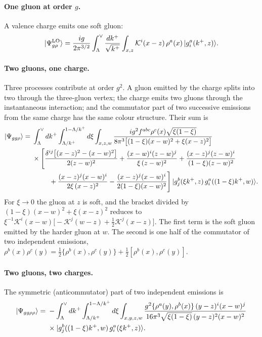 \documentclass[aps,prd,onecolumn,superscriptaddress,nofootinbib,floatfix,longbibliography,11pt]{revtex4-2}
\numberwithin{equation}{section}
\newcommand{\KK}{\mathcal{K}}
\begin{document}
\paragraph*{One gluon at order $g$.} A valence charge emits one soft gluon:
\begin{equation}
|\Psi^{\rm LO}_{g\rho}\rangle=\frac{ig}{2\pi^{3/2}}\int_{\Lambda}^{\vee}\frac{dk^+}{\sqrt{k^+}}\int_{x,z}\KK^i(x-z)\,\rho^a(x)\,|g^a_i(k^+,z)\rangle .
\label{eq:LOwf}
\end{equation}

\paragraph*{Two gluons, one charge.} Three processes contribute at order $g^2$. A gluon emitted by the charge splits into two through the three-gluon vertex; the charge emits two gluons through the instantaneous interaction; and the commutator part of two successive emissions from the same charge has the same colour structure. Their sum is
\begin{align}
|\Psi_{gg\rho}\rangle={}&\int_{\Lambda}^{\vee}dk^+\int_{\Lambda/k^+}^{1-\Lambda/k^+}d\xi\int_{x,z,w}\frac{ig^2f^{abc}\rho^c(x)\sqrt{\xi(1-\xi)}}{8\pi^3\big[(1-\xi)(x-w)^2+\xi(x-z)^2\big]}\notag\\
&\times\Bigg[\frac{\delta^{ij}\big[(x-z)^2-(x-w)^2\big]}{2(z-w)^2}+\frac{(x-w)^i(z-w)^j}{\xi\,(z-w)^2}+\frac{(x-z)^j(z-w)^i}{(1-\xi)(z-w)^2}\notag\\
&\hspace{2.5em}+\frac{(x-z)^j(x-w)^i}{2\xi\,(x-z)^2}-\frac{(x-z)^j(x-w)^i}{2(1-\xi)(x-w)^2}\Bigg]\,|g^b_j(\xi k^+,z)\,g^a_i((1-\xi)k^+,w)\rangle .
\label{eq:ggrho}
\end{align}
For $\xi\to0$ the gluon at $z$ is soft, and the bracket divided by $(1-\xi)(x-w)^2+\xi(x-z)^2$ reduces to $\xi^{-1}\KK^i(x-w)\big[-\KK^j(w-z)+\tfrac12\KK^j(x-z)\big]$. The first term is the soft gluon emitted by the harder gluon at $w$. The second is one half of the commutator of two independent emissions, $\rho^b(x)\rho^c(y)=\frac12\{\rho^b(x),\rho^c(y)\}+\frac12[\rho^b(x),\rho^c(y)]$.

\paragraph*{Two gluons, two charges.} The symmetric (anticommutator) part of two independent emissions is
\begin{align}
|\Psi_{gg\rho\rho}\rangle={}&-\int_{\Lambda}^{\vee}dk^+\int_{\Lambda/k^+}^{1-\Lambda/k^+}d\xi\int_{x,y,z,w}\frac{g^2\{\rho^a(y),\rho^b(x)\}\,(y-z)^i(x-w)^j}{16\pi^3\sqrt{\xi(1-\xi)}\,(y-z)^2(x-w)^2}\notag\\
&\times|g^b_j((1-\xi)k^+,w)\,g^a_i(\xi k^+,z)\rangle .
\label{eq:ggrhorho}
\end{align}
\end{document}
